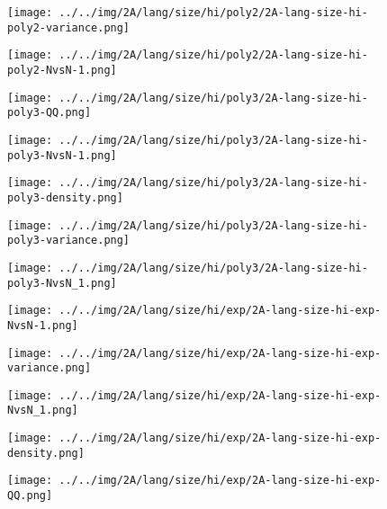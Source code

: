 \begin{figure}[H]
\centering	\texttt{[image: ../../img/2A/lang/size/hi/poly2/2A-lang-size-hi-poly2-variance.png]}
\end{figure}
\begin{figure}[H]
\centering	\texttt{[image: ../../img/2A/lang/size/hi/poly2/2A-lang-size-hi-poly2-NvsN-1.png]}
\end{figure}
\begin{figure}[H]
\centering	\texttt{[image: ../../img/2A/lang/size/hi/poly3/2A-lang-size-hi-poly3-QQ.png]}
\end{figure}
\begin{figure}[H]
\centering	\texttt{[image: ../../img/2A/lang/size/hi/poly3/2A-lang-size-hi-poly3-NvsN-1.png]}
\end{figure}
\begin{figure}[H]
\centering	\texttt{[image: ../../img/2A/lang/size/hi/poly3/2A-lang-size-hi-poly3-density.png]}
\end{figure}
\begin{figure}[H]
\centering	\texttt{[image: ../../img/2A/lang/size/hi/poly3/2A-lang-size-hi-poly3-variance.png]}
\end{figure}
\begin{figure}[H]
\centering	\texttt{[image: ../../img/2A/lang/size/hi/poly3/2A-lang-size-hi-poly3-NvsN\_1.png]}
\end{figure}
\begin{figure}[H]
\centering	\texttt{[image: ../../img/2A/lang/size/hi/exp/2A-lang-size-hi-exp-NvsN-1.png]}
\end{figure}
\begin{figure}[H]
\centering	\texttt{[image: ../../img/2A/lang/size/hi/exp/2A-lang-size-hi-exp-variance.png]}
\end{figure}
\begin{figure}[H]
\centering	\texttt{[image: ../../img/2A/lang/size/hi/exp/2A-lang-size-hi-exp-NvsN\_1.png]}
\end{figure}
\begin{figure}[H]
\centering	\texttt{[image: ../../img/2A/lang/size/hi/exp/2A-lang-size-hi-exp-density.png]}
\end{figure}
\begin{figure}[H]
\centering	\texttt{[image: ../../img/2A/lang/size/hi/exp/2A-lang-size-hi-exp-QQ.png]}
\end{figure}
